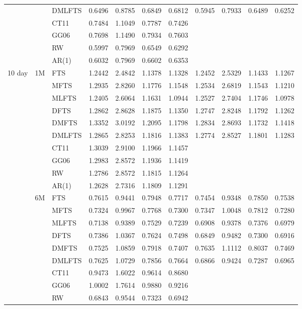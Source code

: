 \documentclass[12pt,a4paper]{article}
\begin{document}
\begin{center}
\begin{small}
\begin{longtable}{@{}lllcccccccc@{}}
  & & DMLFTS & 0.6496 & 0.8785 & 0.6849 & 0.6812 & 0.5945 & 0.7933 & 0.6489 & 0.6252\\
  & & CT11 & 0.7484 & 1.1049 & 0.7787 & 0.7426  \\
  & & GG06 & 0.7698 & 1.1490 & 0.7934 & 0.7603 \\
  & & RW & 0.5997 & 0.7969 & 0.6549 & 0.6292 \\
  & & AR(1) & 0.6032 & 0.7969 & 0.6602 & 0.6353 \\
\midrule   
10 day & 1M & FTS & 1.2442 & 2.4842 & 1.1378 & 1.1328 & 1.2452 & 2.5329 & 1.1433 & 1.1267 \\ 
& & MFTS & 1.2935 & 2.8260 & 1.1776 & 1.1548 & 1.2534 & 2.6819 & 1.1543 & 1.1210 \\ 
& & MLFTS & 1.2405 & 2.6064 & 1.1631 & 1.0944 & 1.2527 & 2.7404 & 1.1746 & 1.0978 \\
 & & DFTS & 1.2862 & 2.8628 & 1.1875 & 1.1350 & 1.2747 & 2.8248 & 1.1792 & 1.1262 \\ 
& & DMFTS & 1.3352 & 3.0192 & 1.2095 & 1.1798 & 1.2834 & 2.8693 & 1.1732 & 1.1418 \\ 
& & DMLFTS & 1.2865 & 2.8253 & 1.1816 & 1.1383 & 1.2774 & 2.8527 & 1.1801 & 1.1283 \\
& & CT11 & 1.3039 & 2.9100 & 1.1966 & 1.1457 \\
& & GG06 & 1.2983 & 2.8572 & 1.1936 & 1.1419 \\
& & RW & 1.2786 & 2.8572 & 1.1815 & 1.1264\\
& & AR(1) & 1.2628 & 2.7316 & 1.1809 & 1.1291 \\
\cmidrule{2-11}     
     & 6M & FTS & 0.7615 & 0.9441 & 0.7948 & 0.7717 & 0.7454 & 0.9348 & 0.7850 & 0.7538 \\ 
& & MFTS & 0.7324 & 0.9967 & 0.7768 & 0.7300 & 0.7347 & 1.0048 & 0.7812 & 0.7280 \\ 
& & MLFTS & 0.7138 & 0.9389 & 0.7529 & 0.7239 & 0.6908 & 0.9378 & 0.7376 & 0.6979 \\
& & DFTS & 0.7386 & 1.0367 & 0.7624 & 0.7498 & 0.6849 & 0.9482 & 0.7300 & 0.6916 \\ 
& & DMFTS & 0.7525 & 1.0859 & 0.7918 & 0.7407 & 0.7635 & 1.1112 & 0.8037 & 0.7469 \\ 
& & DMLFTS & 0.7625 & 1.0729 & 0.7856 & 0.7664 & 0.6866 & 0.9424 & 0.7287 & 0.6965 \\
& & CT11 & 0.9473 & 1.6022 & 0.9614 & 0.8680 \\
& & GG06 & 1.0002 & 1.7614 & 0.9880 & 0.9216 \\
& & RW & 0.6843 & 0.9544 & 0.7323 & 0.6942 \\

\end{longtable}
\end{small}
\end{center}
\end{document}
